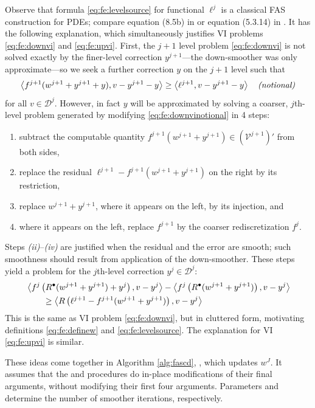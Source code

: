 \documentclass[review,hidelinks,onefignum,onetabnum]{siamart220329}
\newcommand{\ip}[2]{\left<#1,#2\right>}
\newcommand{\iR}{R^{\bullet}}
\begin{document}
Observe that formula \eqref{eq:fe:levelsource} for functional $\ell^j$ is a classical FAS construction for PDEs; compare equation (8.5b) in \cite{BrandtLivne2011} or equation (5.3.14) in \cite{Trottenbergetal2001}.  It has the following explanation, which simultaneously justifies VI problems \eqref{eq:fe:downvi} and \eqref{eq:fe:upvi}.  First, the $j+1$ level problem \eqref{eq:fe:downvi} is not solved exactly by the finer-level correction $y^{j+1}$---the down-smoother was only approximate---so we seek a further correction $y$ on the $j+1$ level such that
\begin{equation}
\ip{f^{j+1}(w^{j+1}+y^{j+1}+y)}{v-y^{j+1}-y} \ge \ip{\ell^{j+1}}{v-y^{j+1}-y} \quad \text{\emph{(notional)}} \label{eq:fe:downvinotional}
\end{equation}
for all $v\in \mathcal{D}^j$.  However, in fact $y$ will be approximated by solving a coarser, $j$th-level problem generated by modifying \eqref{eq:fe:downvinotional} in 4 steps:
\begin{enumerate}
\item subtract the computable quantity $f^{j+1}(w^{j+1}+y^{j+1}) \in (\mathcal{V}^{j+1})'$ from both sides,
\item replace the residual $\ell^{j+1}-f^{j+1}(w^{j+1}+y^{j+1})$ on the right by its restriction,
\item replace $w^{j+1}+y^{j+1}$, where it appears on the left, by its injection, and
\item where it appears on the left, replace $f^{j+1}$ by the coarser rediscretization $f^j$.
\end{enumerate}
Steps \emph{(ii)}--\emph{(iv)} are justified when the residual and the error are smooth; such smoothness should result from application of the down-smoother.  These steps yield a problem for the $j$th-level correction $y^j \in \mathcal{D}^j$:
\begin{align}
&\ip{f^j\left(\iR(w^{j+1}+y^{j+1})+y^j\right)}{v-y^j} - \ip{f^j\left(\iR(w^{j+1}+y^{j+1})\right)}{v-y^j} \label{eq:fe:downvicluttered} \\
&\qquad \ge \ip{R\left(\ell^{j+1}-f^{j+1}(w^{j+1}+y^{j+1})\right)}{v-y^j} \notag
\end{align}
This is the same as VI problem \eqref{eq:fe:downvi}, but in cluttered form, motivating definitions \eqref{eq:fe:definew} and \eqref{eq:fe:levelsource}.  The explanation for VI \eqref{eq:fe:upvi} is similar.

These ideas come together in Algorithm \ref{alg:fascd}, , which updates $w^J$.  It assumes that the  and  procedures do in-place modifications of their final arguments, without modifying their first four arguments.  Parameters  and  determine the number of smoother iterations, respectively.
\end{document}
